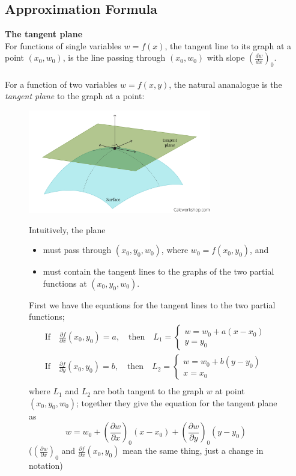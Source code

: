 \documentclass{report}
\begin{document}
\subsection{Approximation Formula}%
\textbf{The tangent plane}\\
For functions of single variables $w=f(x)$, the tangent line to its graph at a point $(x_0,w_0)$, is the line
passing through $(x_0,w_0)$ with slope $\left(\frac{dw}{dx}\right)_0$.\\
\vspace{1mm}\\
For a function of two variables $w=f(x,y)$, the natural ananalogue is the \textit{tangent plane} to the graph 
at a point:
\begin{figure}[h]
\begin{center}
\includegraphics[width=8cm]{97}\\
\end{center}
Intuitively, the plane
\begin{itemize}
\item must pass through $(x_0,y_0,w_0)$, where $w_0=f(x_0,y_0)$, and 
\item must contain the tangent lines to the graphs of the two partial functions at $(x_0,y_0,w_0)$.
\end{itemize}
First we have the equations for the tangent lines to the two partial functions; 
\begin{align*}
\text{If}\quad\frac{\partial f}{\partial x}(x_0,y_0)=a,\quad
\text{then}\quad L_1=\begin{cases}
w=w_0+a(x-x_0)\\
y=y_0
\end{cases}\\
\text{If}\quad\frac{\partial f}{\partial y}(x_0,y_0)=b,\quad
\text{then}\quad L_2=\begin{cases}
w=w_0+b(y-y_0)\\
x=x_0
\end{cases}\\
\end{align*}
where $L_1$ and $L_2$ are both tangent to the graph $w$ at point $(x_0,y_0,w_0)$; together they 
give the equation for the tangent plane as
\begin{equation*}
w=w_0+\left(\frac{\partial w}{\partial x}\right)_0(x-x_0)+
\left(\frac{\partial w}{\partial y}\right)_0(y-y_0)
\end{equation*}
($\left(\frac{\partial w}{\partial x}\right)_0$ and 
$\frac{\partial f}{\partial x}(x_0,y_0)$ mean the same thing, just a change in notation)
\end{figure}\\
\end{document}

